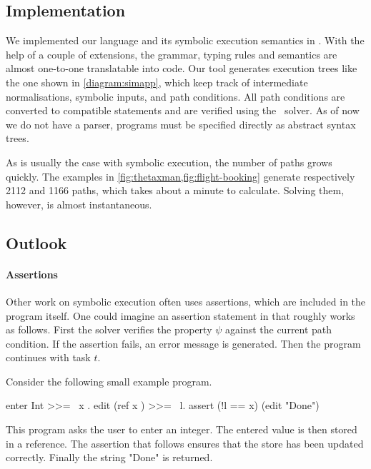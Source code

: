 \subsection{Implementation}

We implemented our language and its symbolic execution semantics in \HASKELL.
With the help of a couple of \GHC extensions, the grammar, typing rules and semantics are almost one-to-one translatable into code.
Our tool generates execution trees like the one shown in \cref{diagram:simapp},
which keep track of intermediate normalisations, symbolic inputs, and path conditions.
All path conditions are converted to \SMTLIB compatible statements and are verified using the \ZTHREE \SMT~solver.
As of now we do not have a parser, programs must be specified directly as abstract syntax trees.

As is usually the case with symbolic execution, the number of paths grows quickly.
The examples in \cref{fig:thetaxman,fig:flight-booking} generate respectively 2112 and 1166 paths,
which takes about a minute to calculate.
Solving them, however, is almost instantaneous.



\subsection{Outlook}
\label{subsec:outlook}

\paragraph{Assertions}

Other work on symbolic execution often uses assertions, which are included in the program itself.
One could imagine an assertion statement  in \TOPHAT that roughly works as follows.
First the \SMT solver verifies the property $\psi$ against the current path condition.
If the assertion fails, an error message is generated.
Then the program continues with task $t$.

\begin{example}
  Consider the following small example program.
  \begin{TASK}
    enter Int >>= \ x . edit (ref x ) >>= \ l. assert (!l == x) (edit "Done")
  \end{TASK}

  This program asks the user to enter an integer.
  The entered value is then stored in a reference.
  The assertion that follows ensures that the store has been updated correctly.
  Finally the string "Done" is returned.
\end{example}

